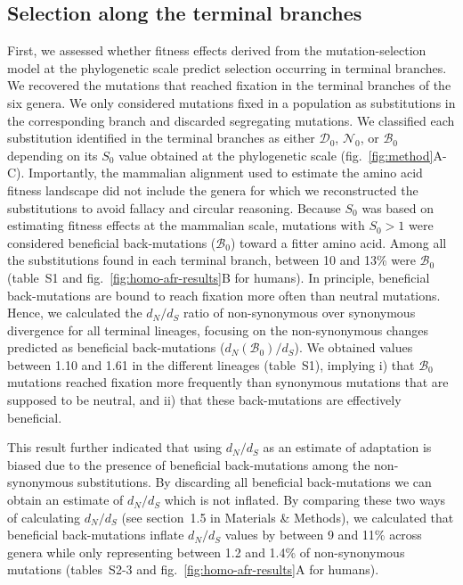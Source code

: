 \documentclass[12pt]{article}
\newcommand{\dn}{d_N}
\newcommand{\ds}{d_S}
\newcommand{\dnds}{\dn / \ds}
\newcommand{\Sphy}{S_{0}}
\newcommand{\SphyDel}{\mathcal{D}_0}
\newcommand{\SphyNeu}{\mathcal{N}_0}
\newcommand{\SphyBen}{\mathcal{B}_0}
\begin{document}
\subsection*{Selection along the terminal branches}
First, we assessed whether fitness effects derived from the mutation-selection model at the phylogenetic scale predict selection occurring in terminal branches.
We recovered the mutations that reached fixation in the terminal branches of the six genera.
We only considered mutations fixed in a population as substitutions in the corresponding branch and discarded segregating mutations.
We classified each substitution identified in the terminal branches as either $\SphyDel$, $\SphyNeu$, or $\SphyBen$ depending on its $\Sphy$ value obtained at the phylogenetic scale (fig.~\ref{fig:method}A-C).
Importantly, the mammalian alignment used to estimate the amino acid fitness landscape did not include the genera for which we reconstructed the substitutions to avoid fallacy and circular reasoning.
Because $\Sphy$ was based on estimating fitness effects at the mammalian scale, mutations with $\Sphy>1$ were considered beneficial back-mutations ($\SphyBen$) toward a fitter amino acid.
Among all the substitutions found in each terminal branch, between 10 and 13\% were $\SphyBen$ (table~S1 and fig.~\ref{fig:homo-afr-results}B for humans).
In principle, beneficial back-mutations are bound to reach fixation more often than neutral mutations.
Hence, we calculated the $\dnds$ ratio of non-synonymous over synonymous divergence for all terminal lineages, focusing on the non-synonymous changes predicted as beneficial back-mutations ($\dn(\SphyBen) / \ds$).
We obtained values between 1.10 and 1.61 in the different lineages (table~S1), implying i) that $\SphyBen$ mutations reached fixation more frequently than synonymous mutations that are supposed to be neutral, and ii) that these back-mutations are effectively beneficial.

This result further indicated that using $\dnds$ as an estimate of adaptation is biased due to the presence of beneficial back-mutations among the non-synonymous substitutions.
By discarding all beneficial back-mutations we can obtain an estimate of $\dnds$ which is not inflated.
By comparing these two ways of calculating $\dnds$ (see section~1.5 in Materials \& Methods), we calculated that beneficial back-mutations inflate $\dnds$ values by between 9 and 11\% across genera while only representing between 1.2 and 1.4\% of non-synonymous mutations (tables~S2-3 and fig.~\ref{fig:homo-afr-results}A for humans).
\end{document}
